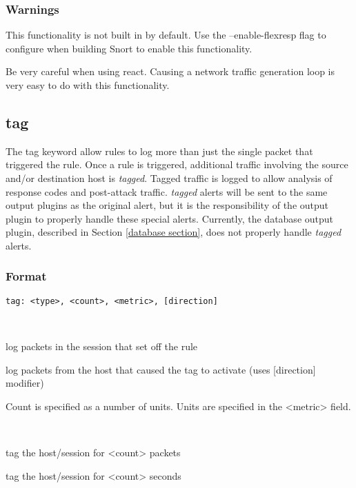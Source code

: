 \documentclass[english]{report}
\begin{document}
\subsubsection{Warnings}

This functionality is not built in by default.  Use the --enable-flexresp flag to configure when building Snort to enable this functionality.

Be very careful when using react.  Causing a network traffic generation loop is very easy to do with this functionality.


\subsection{tag \label{tag section}}

The tag keyword allow rules to log more than just the single packet that
triggered the rule. Once a rule is triggered, additional traffic involving the
source and/or destination host is \emph{tagged}. Tagged traffic is logged to
allow analysis of response codes and post-attack traffic.  \emph{tagged} alerts
will be sent to the same output plugins as the original alert, but it is the
responsibility of the output plugin to properly handle these special alerts.
Currently, the database output plugin, described in Section \ref{database 
section}, does not properly handle \emph{tagged} alerts.


\subsubsection{Format}

\begin{verbatim}
tag: <type>, <count>, <metric>, [direction]
\end{verbatim}

\begin{description}{}
  \item [type]~
     \begin{description}{}
     \item [session] log packets in the session that set off the rule 
     \item [host] log packets from the host that caused the tag to activate (uses {[}direction{]} modifier)
     \end{description}
  \item [count] Count is specified as a number of units. Units are specified in the <metric> field.
  \item [metric]~
  \begin{description}{}
      \item [packets]tag the host/session for <count> packets 
      \item [seconds]tag the host/session for <count> seconds
   \end{description}
\end{description}
\end{document}
